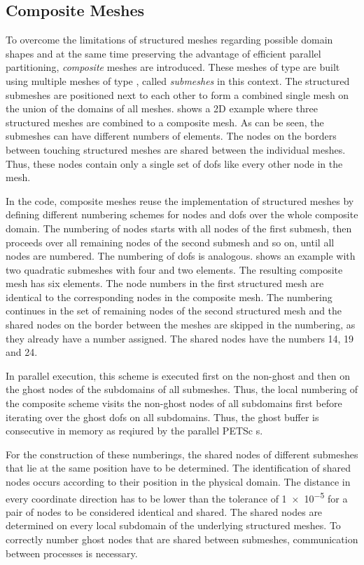\subsection{Composite Meshes}

To overcome the limitations of structured meshes regarding possible domain shapes and at the same time preserving the advantage of efficient parallel partitioning, \emph{composite} meshes are introduced. These meshes of type  are built using multiple meshes of type , called \emph{submeshes} in this context. The structured submeshes are positioned next to each other to form a combined single mesh on the union of the domains of all meshes.  shows a 2D example where three structured meshes are combined to a composite mesh. As can be seen, the submeshes can have different numbers of elements.
The nodes on the borders between touching structured meshes are shared between the individual meshes. Thus, these nodes contain only a single set of dofs like every other node in the mesh.

In the code, composite meshes reuse the implementation of structured meshes by defining different numbering schemes for nodes and dofs over the whole composite domain. The numbering of nodes starts with all nodes of the first submesh, then proceeds over all remaining nodes of the second submesh and so on, until all nodes are numbered. The numbering of dofs is analogous.  shows an example with two quadratic submeshes with four and two elements. The resulting composite mesh has six elements. The node numbers in the first structured mesh are identical to the corresponding nodes in the composite mesh. The numbering continues in the set of remaining nodes of the second structured mesh and the shared nodes on the border between the meshes are skipped in the numbering, as they already have a number assigned. The shared nodes have the numbers 14, 19 and 24.

In parallel execution, this scheme is executed first on the non-ghost and then on the ghost nodes of the subdomains of all submeshes. Thus, the local numbering of the composite scheme visits the non-ghost nodes of all subdomains first before iterating over the ghost dofs on all subdomains. Thus, the ghost buffer is consecutive in memory as reqiured by the parallel PETSc \Vec{}s.

For the construction of these numberings, the shared nodes of different submeshes that lie at the same position have to be determined.
The identification of shared nodes occurs according to their position in the physical domain. The distance in every coordinate direction has to be lower than the tolerance of \num{1e-5} for a pair of nodes to be considered identical and shared. The shared nodes are determined on every local subdomain of the underlying structured meshes. To correctly number ghost nodes that are shared between submeshes, communication between processes is necessary.

